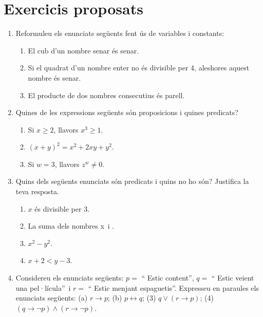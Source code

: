 \chapter{Exercicis proposats}
\label{cap:exercicis}

\begin{enumerate}
\item Reformuleu els enunciats següents fent ús de variables i constants:

\begin{enumerate}
\item El cub d'un nombre senar és senar.

\item Si el quadrat d'un nombre enter no és divisible per 4, aleshores
aquest nombre és senar.

\item El producte de dos nombres consecutius és parell.
\end{enumerate}

\item Quines de les expressions següents són proposicions i quines predicats?

\begin{enumerate}
\item Si $x\geq2$, llavors $x^{3}\geq1.$

\item $(x+y)^{2}=x^{2}+2xy+y^{2}$.

\item Si $w=3$, llavors $z^{w}\neq0$.
\end{enumerate}

\item Quins dels següents enunciats són predicats i quins no ho
són? Justifica la teva resposta.\qquad

\begin{enumerate}
\item $x$ és divisible per 3.

\item La suma dels nombres \thinspace x\thinspace\ i .

\item $x^{2}-y^{2}$.

\item $x+2<y-3$.
\end{enumerate}

\item Considereu els enunciats següents: $p=$ \enquote{ Estic
content}, $q=$ \enquote{ Estic veient una
pel·lícula}\ i $r=$ \enquote{
Estic menjant espaguetis}. Expresseu en paraules els
enunciats següents: (a) $r\longrightarrow p$; (b) $p\longleftrightarrow
q$; (3) $q\vee\left(  r\longrightarrow p\right)  $; (4) $\left(
q\longrightarrow\lnot p\right)  \wedge\left(  r\longrightarrow\lnot p\right)
$.


\end{enumerate}
